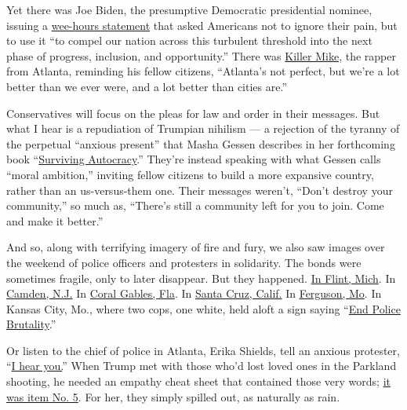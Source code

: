 Yet there was Joe Biden, the presumptive Democratic presidential
nominee, issuing a
\href{https://deadline.com/2020/05/george-floyd-protests-joe-biden-statement-violence-curfews-donald-trump-silent-1202947533/}{wee-hours
statement} that asked Americans not to ignore their pain, but to use it
``to compel our nation across this turbulent threshold into the next
phase of progress, inclusion, and opportunity.'' There was
\href{https://www.youtube.com/watch?v=rapfJYfPU38}{Killer Mike}, the
rapper from Atlanta, reminding his fellow citizens, ``Atlanta's not
perfect, but we're a lot better than we ever were, and a lot better than
cities are.''

Conservatives will focus on the pleas for law and order in their
messages. But what I hear is a repudiation of Trumpian nihilism --- a
rejection of the tyranny of the perpetual ``anxious present'' that Masha
Gessen describes in her forthcoming book
``\href{https://www.washingtonpost.com/outlook/2020/05/28/how-fight-back-against-trumpism-with-moral-aspiration/}{Surviving
Autocracy}.'' They're instead speaking with what Gessen calls ``moral
ambition,'' inviting fellow citizens to build a more expansive country,
rather than an us-versus-them one. Their messages weren't, ``Don't
destroy your community,'' so much as, ``There's still a community left
for you to join. Come and make it better.''

And so, along with terrifying imagery of fire and fury, we also saw
images over the weekend of police officers and protesters in solidarity.
The bonds were sometimes fragile, only to later disappear. But they
happened.
\href{https://twitter.com/Goodable/status/1266933266545881088}{In Flint,
Mich}. In
\href{https://abcnews.go.com/US/wireStory/police-praised-joining-front-line-floyd-protests-70983707}{Camden,
N.J.} In
\href{https://cbs12.com/news/local/police-take-a-knee-in-solidarity-prayer-with-protesters-in-coral-gables}{Coral
Gables, Fla}. In
\href{https://twitter.com/hknightsf/status/1266850494527365120}{Santa
Cruz, Calif.} In
\href{https://www.forbes.com/sites/lisettevoytko/2020/05/31/in-some-cities-police-officers-joined-protesters-marching-against-brutality/\#76c983145edb}{Ferguson,
Mo}. In Kansas City, Mo., where two cops, one white, held aloft a sign
saying
``\href{https://twitter.com/JasonKander/status/1266735093500051457/photo/1}{End
Police Brutality}.''

Or listen to the chief of police in Atlanta, Erika Shields, tell an
anxious protester,
``\href{https://twitter.com/search?q=chief\%20of\%20police\%20atlanta\%20\&src=typed_query}{I
hear you.}'' When Trump met with those who'd lost loved ones in the
Parkland shooting, he needed an empathy cheat sheet that contained those
very words;
\href{https://www.nytimes3xbfgragh.onion/2018/02/22/us/politics/trump-talking-points.html}{it
was item No. 5}. For her, they simply spilled out, as naturally as rain.

